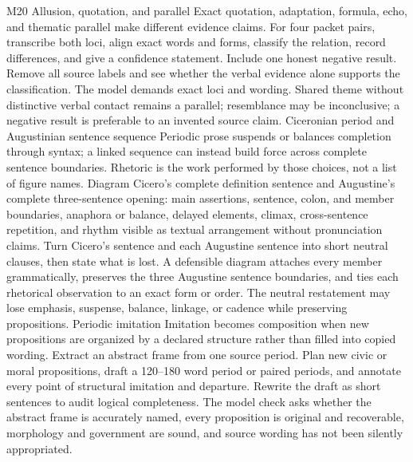 \begin{courseunit}{M20}
\SubmoduleExtension
  {Allusion, quotation, and parallel}
  {Exact quotation, adaptation, formula, echo, and thematic parallel make
  different evidence claims.}
  {For four packet pairs, transcribe both loci, align exact words and forms,
  classify the relation, record differences, and give a confidence statement.
  Include one honest negative result.}
  {Remove all source labels and see whether the verbal evidence alone supports
  the classification.}
  {The model demands exact loci and wording.  Shared theme without distinctive
  verbal contact remains a parallel; resemblance may be inconclusive; a
  negative result is preferable to an invented source claim.}
\SubmoduleExtension
  {Ciceronian period and Augustinian sentence sequence}
  {Periodic prose suspends or balances completion through syntax; a linked
  sequence can instead build force across complete sentence boundaries.
  Rhetoric is the work performed by those choices, not a list of figure names.}
  {Diagram Cicero's complete definition sentence and Augustine's complete
  three-sentence opening: main assertions, sentence, colon, and member
  boundaries, anaphora or balance, delayed elements, climax, cross-sentence
  repetition, and rhythm visible as textual arrangement without pronunciation
  claims.}
  {Turn Cicero's sentence and each Augustine sentence into short neutral
  clauses, then state what is lost.}
  {A defensible diagram attaches every member grammatically, preserves the
  three Augustine sentence boundaries, and ties each rhetorical observation
  to an exact form or order.  The neutral restatement may lose emphasis,
  suspense, balance, linkage, or cadence while preserving propositions.}
\SubmoduleExtension
  {Periodic imitation}
  {Imitation becomes composition when new propositions are organized by a
  declared structure rather than filled into copied wording.}
  {Extract an abstract frame from one source period.  Plan new civic or moral
  propositions, draft a 120--180 word period or paired periods, and annotate
  every point of structural imitation and departure.}
  {Rewrite the draft as short sentences to audit logical completeness.}
  {The model check asks whether the abstract frame is accurately named,
  every proposition is original and recoverable, morphology and government
  are sound, and source wording has not been silently appropriated.}
\end{courseunit}

